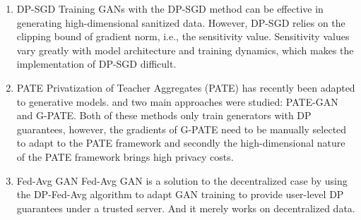 \documentclass[
    ngerman,american
    ]{scrartcl}
\newcommand{\lang}{en}
\begin{document}
        \sectionInitialTOC{\lang}
        \sectionInitialTOCDescription{\lang}
        \begin{enumerate}
            \item{DP-SGD}
            Training GANs with the DP-SGD method can be effective in generating high-dimensional sanitized data. However, DP-SGD relies on the clipping bound of gradient norm, i.e., the sensitivity value. Sensitivity values vary greatly with model architecture and training dynamics, which makes the implementation of DP-SGD difficult.
            \item{PATE} 
            Privatization of Teacher Aggregates (PATE) has recently been adapted to generative models. and two main approaches were studied: PATE-GAN and G-PATE. Both of these methods only train generators with DP guarantees, however, the gradients of G-PATE need to be manually selected to adapt to the PATE framework and secondly the high-dimensional nature of the PATE framework brings high privacy costs.
            \item{Fed-Avg GAN}
             Fed-Avg GAN is a solution to the decentralized case by using the DP-Fed-Avg algorithm to adapt GAN training to provide user-level DP guarantees under a trusted server. And it merely works on decentralized data.
        \end{enumerate}
 
\end{document}
